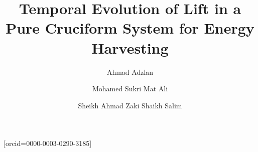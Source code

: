 \documentclass[a4paper,fleqn]{cas-sc}
\begin{document}
\let\WriteBookmarks\relax
\def\floatpagepagefraction{1}
\def\textpagefraction{.001}

\title [mode = title]{Temporal Evolution of Lift in a Pure Cruciform System for Energy Harvesting}                      
%
%



\author[1,2]{Ahmad Adzlan}[orcid=0000-0003-0290-3185]
\cormark[1]


\address[1]{Malaysia-Japan International Institute of Technology, Universiti Teknologi Malaysia, 54200 Kuala Lumpur, Malaysia}

\author[1]{Mohamed Sukri Mat Ali}

\author[1]{Sheikh Ahmad Zaki Shaikh Salim}

\address[2]{Faculty of Engineering, Universiti Malaysia Sarawak, 94300 Kota Samarahan, Sarawak, Malaysia}


\end{document}
